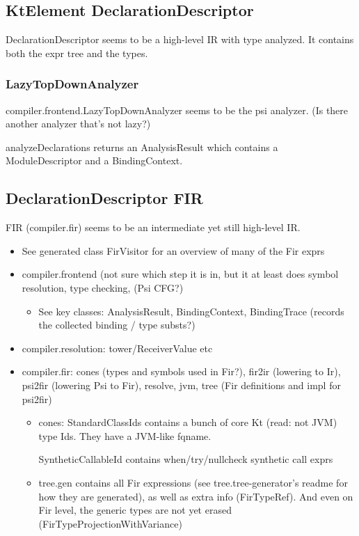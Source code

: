 \documentclass{article}
\begin{document}
\subsection{KtElement \textSafeTo DeclarationDescriptor}

DeclarationDescriptor seems to be a high-level IR with type analyzed. It contains both the expr tree and the types.

\subsubsection{LazyTopDownAnalyzer}

compiler.frontend.LazyTopDownAnalyzer seems to be the psi analyzer. (Is there another analyzer that's not lazy?)

analyzeDeclarations returns an AnalysisResult which contains a ModuleDescriptor and a BindingContext.

\subsection{DeclarationDescriptor \textSafeTo FIR}

FIR (compiler.fir) seems to be an intermediate yet still high-level IR.

\begin{itemize}
    \item See generated class FirVisitor for an overview of many of the Fir exprs
    \item compiler.frontend (not sure which step it is in, but it at least does symbol resolution, type checking, (Psi \textSafeTo CFG?)
    \begin{itemize}
        \item See key classes: AnalysisResult, BindingContext, BindingTrace (records the collected binding / type substs?)
    \end{itemize}
    \item compiler.resolution: tower/ReceiverValue etc
    \item compiler.fir: cones (types and symbols used in Fir?), fir2ir (lowering to Ir), psi2fir (lowering Psi to Fir), resolve, jvm, tree (Fir definitions and impl for psi2fir)
    \begin{itemize}
        \item cones: StandardClassIds contains a bunch of core Kt (read: not JVM) type Ids. They have a JVM-like fqname.

        SyntheticCallableId contains when/try/nullcheck synthetic call exprs

        \item tree.gen contains all Fir expressions (see tree.tree-generator's readme for how they are generated), as well as extra info (FirTypeRef). And even on Fir level, the generic types are not yet erased (FirTypeProjectionWithVariance)
    \end{itemize}
\end{itemize}
\end{document}
